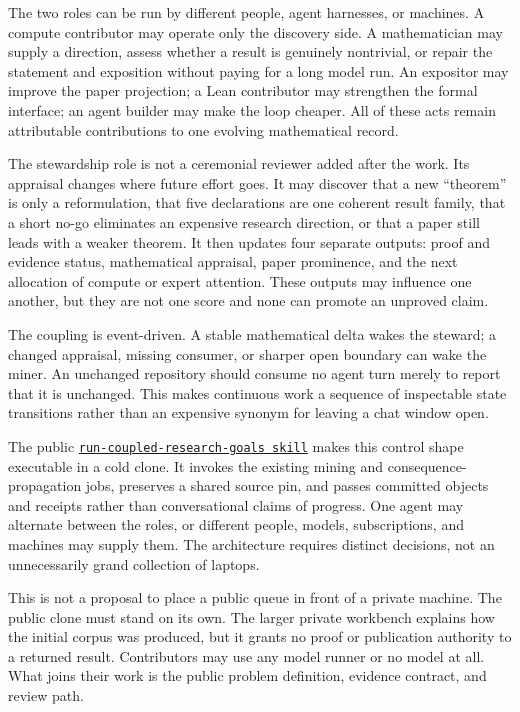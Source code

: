 \documentclass[10pt]{article}
\newcommand{\repobase}{https://github.com/wcook04/plectis-lean-erdos249-257}
\newcommand{\repolink}[2]{\href{\repobase/blob/ca0e13f8acf5ccf48506e4bdb870953d3a0856fa/#1}{\texttt{#2}}}
\begin{document}
The two roles can be run by different people, agent harnesses, or machines.
A compute contributor may operate only the discovery side.  A mathematician
may supply a direction, assess whether a result is genuinely nontrivial, or
repair the statement and exposition without paying for a long model run.  An
expositor may improve the paper projection; a Lean contributor may strengthen
the formal interface; an agent builder may make the loop cheaper.  All of
these acts remain attributable contributions to one evolving mathematical
record.

The stewardship role is not a ceremonial reviewer added after the work.  Its
appraisal changes where future effort goes.  It may discover that a new
``theorem'' is only a reformulation, that five declarations are one coherent
result family, that a short no-go eliminates an expensive research direction,
or that a paper still leads with a weaker theorem.  It then updates four
separate outputs: proof and evidence status, mathematical appraisal, paper
prominence, and the next allocation of compute or expert attention.  These
outputs may influence one another, but they are not one score and none can
promote an unproved claim.

The coupling is event-driven.  A stable mathematical delta wakes the steward;
a changed appraisal, missing consumer, or sharper open boundary can wake the
miner.  An unchanged repository should consume no agent turn merely to report
that it is unchanged.  This makes continuous work a sequence of inspectable
state transitions rather than an expensive synonym for leaving a chat window
open.

The public \repolink{skills/run-coupled-research-goals/SKILL.md}%
{run-coupled-research-goals skill} makes this control shape executable in a
cold clone.  It invokes the existing mining and consequence-propagation jobs,
preserves a shared source pin, and passes committed objects and receipts rather
than conversational claims of progress.  One agent may alternate between the
roles, or different people, models, subscriptions, and machines may supply
them.  The architecture requires distinct decisions, not an unnecessarily
grand collection of laptops.

This is not a proposal to place a public queue in front of a private machine.
The public clone must stand on its own.  The larger private workbench explains
how the initial corpus was produced, but it grants no proof or publication
authority to a returned result.  Contributors may use any model runner or no
model at all.  What joins their work is the public problem definition,
evidence contract, and review path.
\end{document}
